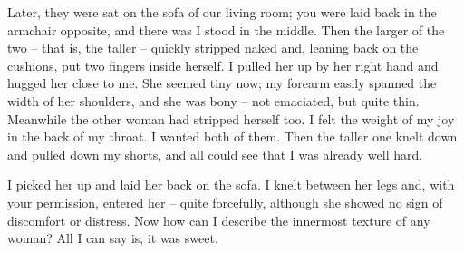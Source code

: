 Later, they were sat on the sofa of our living room; you were laid back in the armchair opposite, and there was I stood in the middle. Then the larger of the two -- that is, the taller -- quickly stripped naked and, leaning back on the cushions, put two fingers inside herself. I pulled her up by her right hand and hugged her close to me. She seemed tiny now; my forearm easily spanned the width of her shoulders, and she was bony -- not emaciated, but quite thin. Meanwhile the other woman had stripped herself too. I felt the weight of my joy in the back of my throat. I wanted both of them. Then the taller one knelt down and pulled down my shorts, and all could see that I was already well hard.

I picked her up and laid her back on the sofa. I knelt between her legs and, with your permission, entered her -- quite forcefully, although she showed no sign of discomfort or distress. Now how can I describe the innermost texture of any woman? All I can say is, it was sweet.
